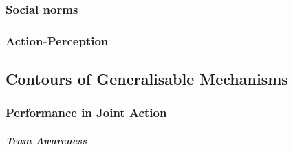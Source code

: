 
    \subsubsection{Social norms}




    \subsubsection{Action-Perception}





  \subsection{Contours of Generalisable Mechanisms}

    \subsubsection{Performance in Joint Action}


          \subparagraph{Team Awareness}

